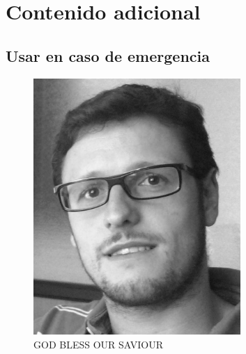 \documentclass[oneside]{book}
\begin{document}
	\chapter{Contenido adicional}
	\section{Usar en caso de emergencia}
	\begin{figure}[h]
		\centering
		\includegraphics[width=0.7\textwidth]{foto}
		\caption*{GOD BLESS OUR SAVIOUR}
	\end{figure}
	\backmatter
	\printindex
\end{document}
